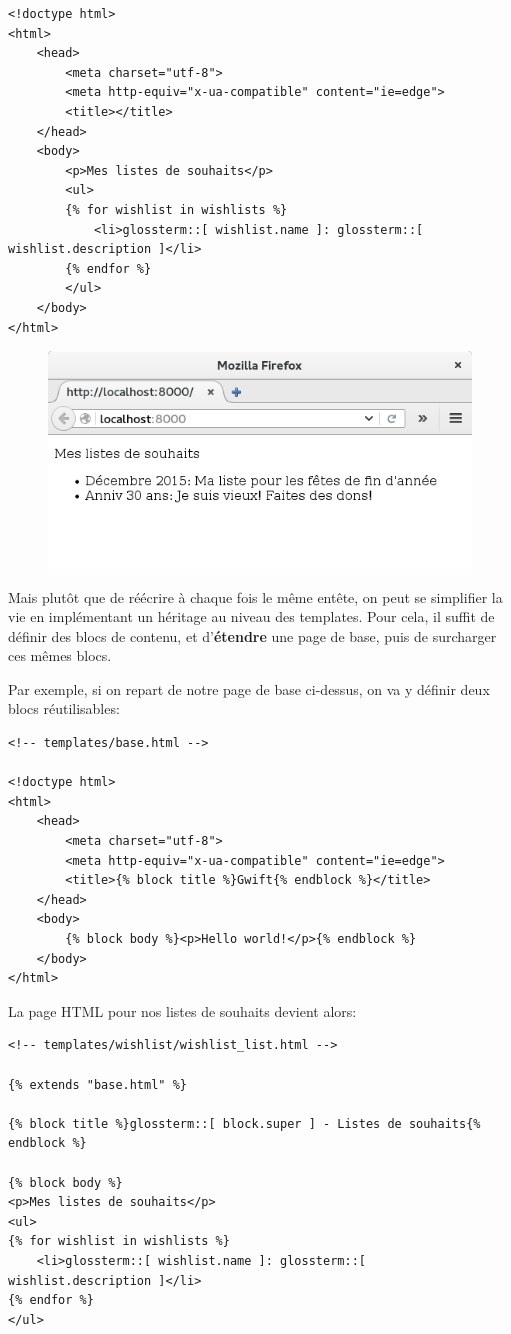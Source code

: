 \documentclass[11pt]{amsbook}
\begin{document}
\begin{verbatim}
<!doctype html>
<html>
    <head>
        <meta charset="utf-8">
        <meta http-equiv="x-ua-compatible" content="ie=edge">
        <title></title>
    </head>
    <body>
        <p>Mes listes de souhaits</p>
        <ul>
        {% for wishlist in wishlists %}
            <li>glossterm::[ wishlist.name ]: glossterm::[ wishlist.description ]</li>
        {% endfor %}
        </ul>
    </body>
</html>
\end{verbatim}

\begin{figure}[h]{}
\centering\includegraphics[width=2.5truein]{images/html/my-first-wishlists.png}


\end{figure}

Mais plutôt que de réécrire à chaque fois le même entête, on peut se simplifier la vie en implémentant un héritage au niveau des templates. Pour cela, il suffit de définir des blocs de contenu, et d'\textbf{étendre} une page de base, puis de surcharger ces mêmes blocs.


Par exemple, si on repart de notre page de base ci-dessus, on va y définir deux blocs réutilisables:


\begin{verbatim}
<!-- templates/base.html -->

<!doctype html>
<html>
    <head>
        <meta charset="utf-8">
        <meta http-equiv="x-ua-compatible" content="ie=edge">
        <title>{% block title %}Gwift{% endblock %}</title> 
    </head>
    <body>
        {% block body %}<p>Hello world!</p>{% endblock %} 
    </body>
</html>
\end{verbatim}


La page HTML pour nos listes de souhaits devient alors:


\begin{verbatim}
<!-- templates/wishlist/wishlist_list.html -->

{% extends "base.html" %} 

{% block title %}glossterm::[ block.super ] - Listes de souhaits{% endblock %} 

{% block body %} 
<p>Mes listes de souhaits</p>
<ul>
{% for wishlist in wishlists %}
    <li>glossterm::[ wishlist.name ]: glossterm::[ wishlist.description ]</li>
{% endfor %}
</ul>
\end{verbatim}
\end{document}
